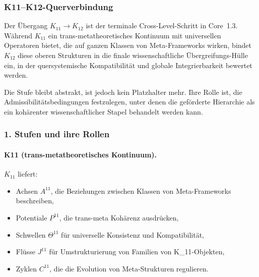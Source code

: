 
\subsubsection{K11–K12-Querverbindung}
\label{sec:crossk-k11-k12}

Der Übergang $K_{11} \rightarrow K_{12}$ ist der terminale Cross-Level-Schritt in
Core~1.3. Während $K_{11}$ ein trans-metatheoretisches Kontinuum mit
universellen Operatoren bietet, die auf ganzen Klassen von Meta-Frameworks wirken,
bindet $K_{12}$ diese oberen Strukturen in die finale wissenschaftliche
Übergreifungs-Hülle ein, in der quersystemische Kompatibilität und globale
Integrierbarkeit bewertet werden.

Die Stufe bleibt abstrakt, ist jedoch kein Platzhalter mehr. Ihre Rolle ist,
die Admissibilitätsbedingungen festzulegen, unter denen die geförderte Hierarchie
als ein kohärenter wissenschaftlicher Stapel behandelt werden kann.

\subsubsection{1. Stufen und ihre Rollen}

\paragraph{K11 (trans-metatheoretisches Kontinuum).}
$K_{11}$ liefert:
\begin{itemize}
  \item Achsen $A^{11}$, die Beziehungen zwischen Klassen von Meta-Frameworks
        beschreiben,
  \item Potentiale $P^{11}$, die trans-meta Kohärenz ausdrücken,
  \item Schwellen $\Theta^{11}$ für universelle Konsistenz und Kompatibilität,
  \item Flüsse $J^{11}$ für Umstrukturierung von Familien von K_{11}-Objekten,
  \item Zyklen $C^{11}$, die die Evolution von Meta-Strukturen regulieren.
\end{itemize}

